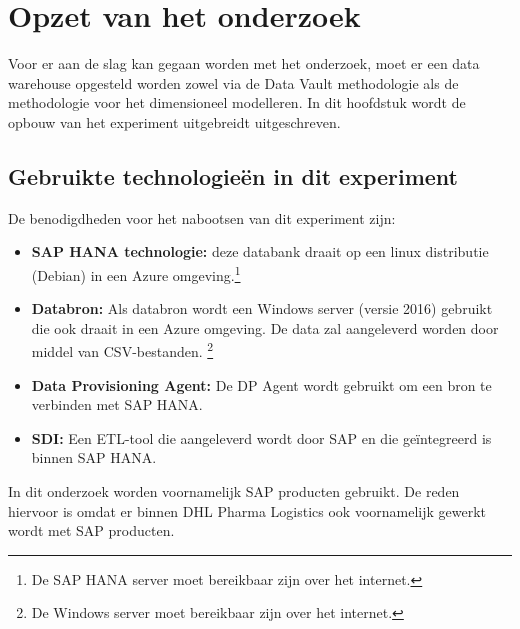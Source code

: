 
\chapter{Opzet van het onderzoek}
\label{ch:voorbereidingonderzoek}

Voor er aan de slag kan gegaan worden met het onderzoek, moet er een data warehouse opgesteld worden zowel via de Data Vault methodologie als de methodologie voor het dimensioneel modelleren. In dit hoofdstuk wordt de opbouw van het experiment uitgebreidt uitgeschreven.

\section{Gebruikte technologieën in dit experiment}
De benodigdheden voor het nabootsen van dit experiment zijn:

\begin{itemize}
	\item \textbf{SAP HANA technologie:} deze databank draait op een linux distributie (Debian) in een Azure omgeving.\footnote[1]{De SAP HANA server moet bereikbaar zijn over het internet.}
	\item \textbf{Databron:} Als databron wordt een Windows server (versie 2016) gebruikt die ook draait in een Azure omgeving. De data zal aangeleverd worden door middel van CSV-bestanden. \footnote[2]{De Windows server moet bereikbaar zijn over het internet.}
	\item \textbf{Data Provisioning Agent:} De DP Agent wordt gebruikt om een bron te verbinden met SAP HANA.
	\item \textbf{SDI:} Een ETL-tool die aangeleverd wordt door SAP en die geïntegreerd is binnen SAP HANA.
\end{itemize}

In dit onderzoek worden voornamelijk SAP producten gebruikt. De reden hiervoor is omdat er binnen DHL Pharma Logistics ook voornamelijk gewerkt wordt met SAP producten.

